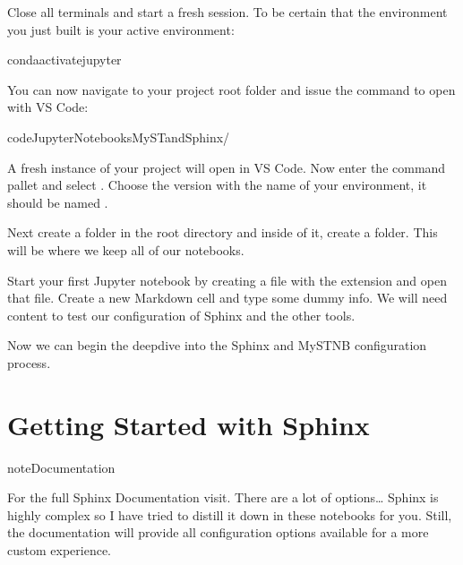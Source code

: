 \documentclass[letterpaper,12pt,english]{sphinxmanual}
\begin{document}
\sphinxAtStartPar
Close all terminals and start a fresh session. To be certain that the environment you just built is your active  environment:

\begin{sphinxVerbatim}[commandchars=\\\{\}]
condaactivatejupyter
\end{sphinxVerbatim}

\sphinxAtStartPar
You can now navigate to your project root folder and issue the command to open with VS Code:

\begin{sphinxVerbatim}[commandchars=\\\{\}]
codeJupyter\PYGZhy{}Notebooks\PYGZhy{}MyST\PYGZhy{}and\PYGZhy{}Sphinx/
\end{sphinxVerbatim}

\sphinxAtStartPar
A fresh instance of your project will open in VS Code. Now enter the command pallet  and select . Choose the version with the name of your  environment, it should be named .

\sphinxAtStartPar
Next create a  folder in the root directory and inside of it, create a  folder. This will be where we keep all of our notebooks.

\sphinxAtStartPar
Start your first Jupyter notebook by creating a file with the extension  and open that file. Create a new Markdown cell and type some dummy info. We will need content to test our configuration of Sphinx and the other tools.

\sphinxAtStartPar
Now we can begin the deep\sphinxhyphen{}dive into the Sphinx and MyST\sphinxhyphen{}NB configuration process.


\section{Getting Started with Sphinx}
\label{\detokenize{notebooks/03-sphinx-config:getting-started-with-sphinx}}
\begin{sphinxadmonition}{note}{Documentation}

\sphinxAtStartPar
For the full Sphinx Documentation visit. There are a lot of options… Sphinx is highly complex so I have tried to distill it down in these notebooks for you. Still, the documentation will provide all configuration options available for a more custom experience.
\end{sphinxadmonition}
\end{document}
